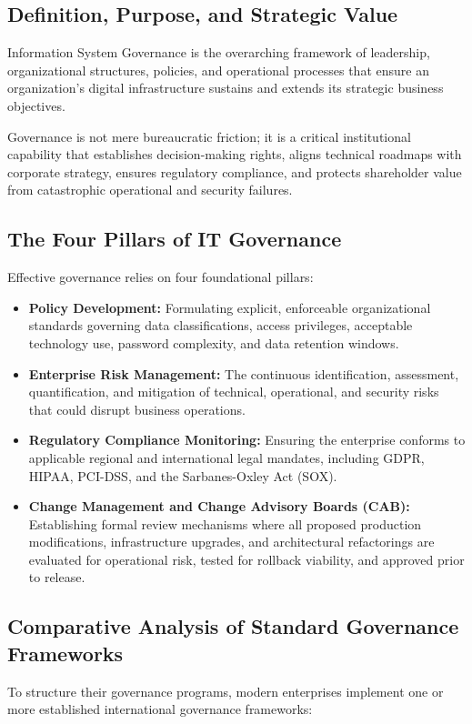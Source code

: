 \documentclass[11pt,a4paper]{article}
\begin{document}
\subsection{Definition, Purpose, and Strategic Value}
Information System Governance is the overarching framework of leadership, organizational structures, policies, and operational processes that ensure an organization's digital infrastructure sustains and extends its strategic business objectives.

Governance is not mere bureaucratic friction; it is a critical institutional capability that establishes decision-making rights, aligns technical roadmaps with corporate strategy, ensures regulatory compliance, and protects shareholder value from catastrophic operational and security failures.

\subsection{The Four Pillars of IT Governance}
Effective governance relies on four foundational pillars:
\begin{itemize}
    \item \textbf{Policy Development:} Formulating explicit, enforceable organizational standards governing data classifications, access privileges, acceptable technology use, password complexity, and data retention windows.
    \item \textbf{Enterprise Risk Management:} The continuous identification, assessment, quantification, and mitigation of technical, operational, and security risks that could disrupt business operations.
    \item \textbf{Regulatory Compliance Monitoring:} Ensuring the enterprise conforms to applicable regional and international legal mandates, including GDPR, HIPAA, PCI-DSS, and the Sarbanes-Oxley Act (SOX).
    \item \textbf{Change Management and Change Advisory Boards (CAB):} Establishing formal review mechanisms where all proposed production modifications, infrastructure upgrades, and architectural refactorings are evaluated for operational risk, tested for rollback viability, and approved prior to release.
\end{itemize}

\subsection{Comparative Analysis of Standard Governance Frameworks}
To structure their governance programs, modern enterprises implement one or more established international governance frameworks:
\end{document}
